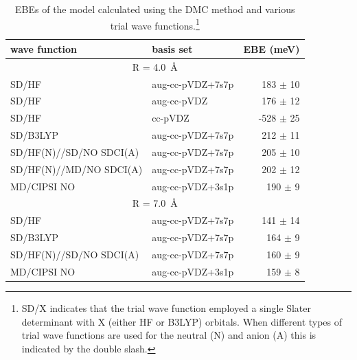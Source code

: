 \begin{table}
    \caption{\label{tab:DMC} EBEs of the  model calculated using the DMC method and various trial wave functions.\protect\footnote{SD/X indicates that the trial wave function employed a single Slater determinant with X (either HF or B3LYP) orbitals. When different types of trial wave functions are used for the neutral (N) and anion (A) this is indicated by the double slash.}}
    \begin{tabular}{llr}
wave function                  & basis set        &  EBE (meV) \\ \hline
\multicolumn{3}{c}{R = \SI{4.0}{\angstrom}}               \\ 
SD/HF                         & aug-cc-pVDZ+7s7p &  183 $\pm$ 10 \\
SD/HF                         & aug-cc-pVDZ      &  176 $\pm$ 12 \\
SD/HF                         & cc-pVDZ          & -528 $\pm$ 25 \\ 
SD/B3LYP                      & aug-cc-pVDZ+7s7p &  212 $\pm$ 11 \\
SD/HF(N)//SD/NO SDCI(A)    & aug-cc-pVDZ+7s7p &  205 $\pm$ 10 \\
SD/HF(N)//MD/NO SDCI(A)    & aug-cc-pVDZ+7s7p &  202 $\pm$ 12 \\
MD/CIPSI NO                   & aug-cc-pVDZ+3s1p &  190 $\pm$ 9  \\ \hline
\multicolumn{3}{c}{R = \SI{7.0}{\angstrom}}                    \\ 
SD/HF                         & aug-cc-pVDZ+7s7p &   141 $\pm$ 14 \\ 
SD/B3LYP                      & aug-cc-pVDZ+7s7p &   164 $\pm$ 9 \\
SD/HF(N)//SD/NO SDCI(A)    & aug-cc-pVDZ+7s7p &  160 $\pm$ 9 \\
MD/CIPSI NO                   & aug-cc-pVDZ+3s1p &    159 $\pm$ 8 \\
\end{tabular}
\end{table}


